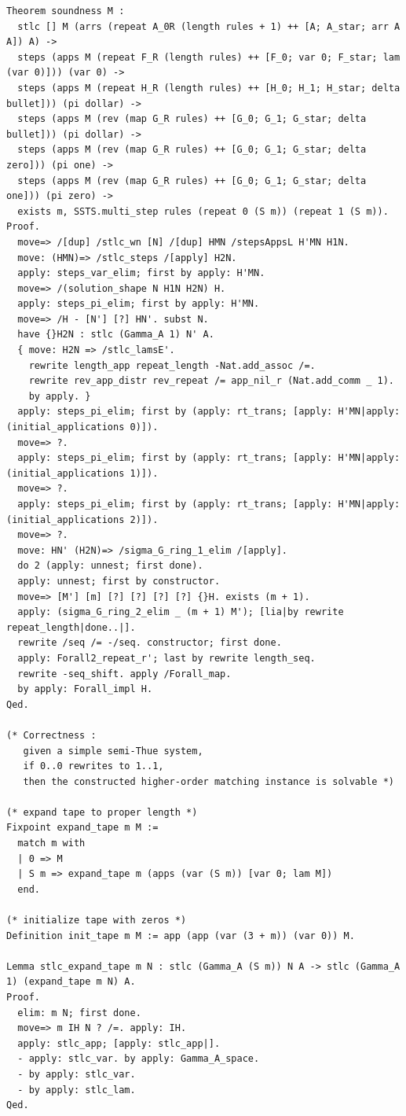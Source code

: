 \begin{lstlisting}
Theorem soundness M :
  stlc [] M (arrs (repeat A_0R (length rules + 1) ++ [A; A_star; arr A A]) A) ->
  steps (apps M (repeat F_R (length rules) ++ [F_0; var 0; F_star; lam (var 0)])) (var 0) ->
  steps (apps M (repeat H_R (length rules) ++ [H_0; H_1; H_star; delta bullet])) (pi dollar) ->
  steps (apps M (rev (map G_R rules) ++ [G_0; G_1; G_star; delta bullet])) (pi dollar) ->
  steps (apps M (rev (map G_R rules) ++ [G_0; G_1; G_star; delta zero])) (pi one) ->
  steps (apps M (rev (map G_R rules) ++ [G_0; G_1; G_star; delta one])) (pi zero) ->
  exists m, SSTS.multi_step rules (repeat 0 (S m)) (repeat 1 (S m)).
Proof.
  move=> /[dup] /stlc_wn [N] /[dup] HMN /stepsAppsL H'MN H1N.
  move: (HMN)=> /stlc_steps /[apply] H2N.
  apply: steps_var_elim; first by apply: H'MN.
  move=> /(solution_shape N H1N H2N) H.
  apply: steps_pi_elim; first by apply: H'MN.
  move=> /H - [N'] [?] HN'. subst N.
  have {}H2N : stlc (Gamma_A 1) N' A.
  { move: H2N => /stlc_lamsE'.
    rewrite length_app repeat_length -Nat.add_assoc /=.
    rewrite rev_app_distr rev_repeat /= app_nil_r (Nat.add_comm _ 1).
    by apply. }
  apply: steps_pi_elim; first by (apply: rt_trans; [apply: H'MN|apply: (initial_applications 0)]).
  move=> ?.
  apply: steps_pi_elim; first by (apply: rt_trans; [apply: H'MN|apply: (initial_applications 1)]).
  move=> ?.
  apply: steps_pi_elim; first by (apply: rt_trans; [apply: H'MN|apply: (initial_applications 2)]).
  move=> ?.
  move: HN' (H2N)=> /sigma_G_ring_1_elim /[apply].
  do 2 (apply: unnest; first done).
  apply: unnest; first by constructor.
  move=> [M'] [m] [?] [?] [?] [?] {}H. exists (m + 1).
  apply: (sigma_G_ring_2_elim _ (m + 1) M'); [lia|by rewrite repeat_length|done..|].
  rewrite /seq /= -/seq. constructor; first done.
  apply: Forall2_repeat_r'; last by rewrite length_seq.
  rewrite -seq_shift. apply /Forall_map.
  by apply: Forall_impl H.
Qed.

(* Correctness :
   given a simple semi-Thue system,
   if 0..0 rewrites to 1..1,
   then the constructed higher-order matching instance is solvable *)

(* expand tape to proper length *)
Fixpoint expand_tape m M :=
  match m with
  | 0 => M
  | S m => expand_tape m (apps (var (S m)) [var 0; lam M])
  end.

(* initialize tape with zeros *)
Definition init_tape m M := app (app (var (3 + m)) (var 0)) M.

Lemma stlc_expand_tape m N : stlc (Gamma_A (S m)) N A -> stlc (Gamma_A 1) (expand_tape m N) A.
Proof.
  elim: m N; first done.
  move=> m IH N ? /=. apply: IH.
  apply: stlc_app; [apply: stlc_app|].
  - apply: stlc_var. by apply: Gamma_A_space.
  - by apply: stlc_var.
  - by apply: stlc_lam.
Qed.


\end{lstlisting}
